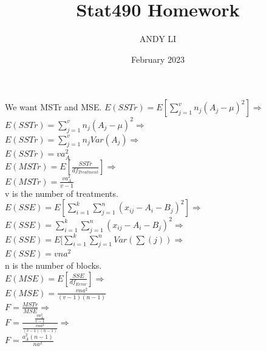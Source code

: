 \documentclass{article}
\title{Stat490 Homework}
\author{ANDY LI}
\date{February 2023}
\begin{document}
\maketitle
We want MSTr and MSE.
$E(SSTr) = E[\sum_{j=1}^vn_j(A_j-\mu)^2] \Rightarrow$
\\
$E(SSTr) = \sum_{j=1}^vn_j(A_j-\mu)^2 \Rightarrow$
\\
$E(SSTr) = \sum_{j=1}^vn_jVar(A_j) \Rightarrow$
\\
$E(SSTr) = va^2_A$
\\
$E(MSTr) = E[\frac{SSTr}{df_{Treatment}}] \Rightarrow$
\\
$E(MSTr) = \frac{va^2_A}{v-1}$
\\v is the number of treatments.
\\
$E(SSE) = E[\sum_{i=1}^k\sum_{j=1}^n(x_{ij}-A_i-B_j)^2] \Rightarrow$
\\
$E(SSE) = \sum_{i=1}^k\sum_{j=1}^n(x_{ij}-A_i-B_j)^2 \Rightarrow$
\\
$E(SSE) = E[\sum_{i=1}^k\sum_{j=1}^nVar(\sum(j)) \Rightarrow$
\\
$E(SSE) = vna^2$ 
\\n is the number of blocks.
\\
$E(MSE) = E[\frac{SSE}{df_{Error}}] \Rightarrow$
\\
$E(MSE) = \frac{vna^2}{(v-1)(n-1)}$
\\
$F = \frac{MSTr}{MSE} \Rightarrow$
\\
$F = \frac{\frac{va^2_A}{v-1}}{\frac{vna^2}{(v-1)(n-1)}} \Rightarrow$
\\
$F = \frac{a^2_A(n-1)}{na^2}$
\end{document}
